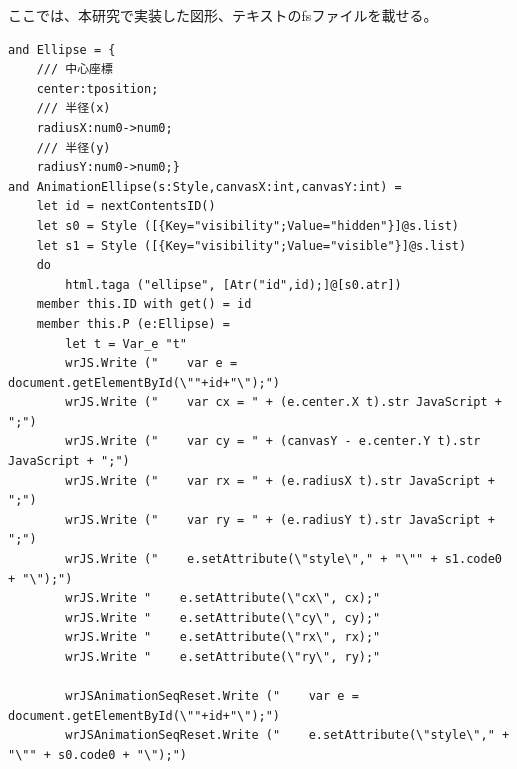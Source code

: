 ここでは、本研究で実装した図形、テキストのfsファイルを載せる。
\begin{lstlisting}[caption={円を描画するアニメーション},label={ellipse},breaklines=true,breakatwhitespace=false]
and Ellipse = {
    /// 中心座標
    center:tposition; 
    /// 半径(x)
    radiusX:num0->num0; 
    /// 半径(y)
    radiusY:num0->num0;}
and AnimationEllipse(s:Style,canvasX:int,canvasY:int) =
    let id = nextContentsID()
    let s0 = Style ([{Key="visibility";Value="hidden"}]@s.list)
    let s1 = Style ([{Key="visibility";Value="visible"}]@s.list)
    do
        html.taga ("ellipse", [Atr("id",id);]@[s0.atr])
    member this.ID with get() = id
    member this.P (e:Ellipse) = 
        let t = Var_e "t"
        wrJS.Write ("    var e = document.getElementById(\""+id+"\");")
        wrJS.Write ("    var cx = " + (e.center.X t).str JavaScript + ";")
        wrJS.Write ("    var cy = " + (canvasY - e.center.Y t).str JavaScript + ";")
        wrJS.Write ("    var rx = " + (e.radiusX t).str JavaScript + ";")
        wrJS.Write ("    var ry = " + (e.radiusY t).str JavaScript + ";")
        wrJS.Write ("    e.setAttribute(\"style\"," + "\"" + s1.code0 + "\");")
        wrJS.Write "    e.setAttribute(\"cx\", cx);"
        wrJS.Write "    e.setAttribute(\"cy\", cy);"
        wrJS.Write "    e.setAttribute(\"rx\", rx);"
        wrJS.Write "    e.setAttribute(\"ry\", ry);"
        
        wrJSAnimationSeqReset.Write ("    var e = document.getElementById(\""+id+"\");")
        wrJSAnimationSeqReset.Write ("    e.setAttribute(\"style\"," + "\"" + s0.code0 + "\");")
\end{lstlisting}
